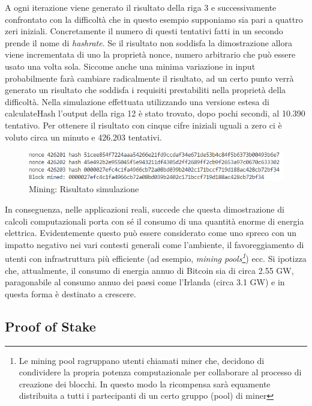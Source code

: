 A ogni iterazione viene generato il risultato della riga 3 e successivamente confrontato con la difficoltà che in questo esempio supponiamo sia pari a quattro zeri iniziali. Concretamente il numero di questi tentativi fatti in un secondo prende il nome di \emph{hashrate}. Se il risultato non soddisfa la dimostrazione allora viene incrementata di uno la proprietà nonce, numero arbitrario che può essere usato una volta sola. Siccome anche una minima variazione in input probabilmente farà cambiare radicalmente il risultato, ad un certo punto verrà generato un risultato che soddisfa i requisiti prestabiliti nella proprietà della difficoltà. Nella simulazione effettuata utilizzando una versione estesa di calculateHash l'output della riga 12 è stato trovato, dopo pochi secondi, al 10.390 tentativo. Per ottenere il risultato con cinque cifre iniziali uguali a zero ci è voluto circa un minuto e 426.203 tentativi.
\\

\begin{figure}[H]
\centering
\includegraphics[width=1\textwidth]{immagini/miningOutput.png}
\caption{Mining: Risultato simulazione}
\label{fig:SimulazionePoW}
\end{figure}

In conseguenza, nelle applicazioni reali, succede che questa dimostrazione di calcoli computazionali porta con sé il consumo di una quantità enorme di energia elettrica. Evidentemente questo può essere considerato come uno spreco con un impatto negativo nei vari contesti generali come l’ambiente, il favoreggiamento di utenti con infrastruttura più efficiente (ad esempio, \emph{mining pools\footnote{Le mining pool ragruppano utenti chiamati miner che, decidono di condividere la propria potenza computazionale per collaborare al processo di creazione dei blocchi. In questo modo la ricompensa sarà equamente distribuita a tutti i partecipanti di un certo gruppo (pool) di miner}}) ecc.
Si ipotizza che, attualmente, il consumo di energia annuo di Bitcoin sia di circa 2.55 GW, paragonabile al consumo annuo dei paesi come l’Irlanda (circa 3.1 GW) e in questa forma è destinato a crescere.

\subsection{Proof of Stake}

